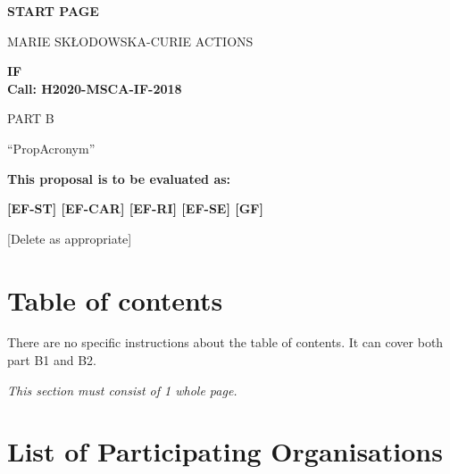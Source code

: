 
\phantom{a}
\vspace{15mm}
\begin{center}


        \Large{
      
     
        \textbf{START PAGE}
  
          \vspace{15mm}
          MARIE SK\L{}ODOWSKA-CURIE ACTIONS\\
          \vspace{1cm}
          
          \textbf{\acf{IF}}\\
          \textbf{Call: H2020-MSCA-IF-2018}
          \vspace{2cm}                   

          PART B
          \vspace{2.5cm}

          ``{\sc \ac{PropAcronym}\xspace}''
          \vspace{2cm}

          \textbf{This proposal is to be evaluated as:}
          \vspace{.5cm}

          \textbf{[EF-ST] [EF-CAR] [EF-RI] [EF-SE] [GF]}\\
        }
        \large{[Delete as appropriate]}

  \end{center}
\vspace{1cm}

\newpage
\setcounter{tocdepth}{1}
\tableofcontents


\newpage

\section*{Table of contents}
\label{sec:toc}

There are no specific instructions about the table of contents. It can cover both part B1 and B2.

\medskip\noindent
\emph{This section must consist of 1 whole page.}


\section*{List of Participating Organisations}
\label{sec:participants}

